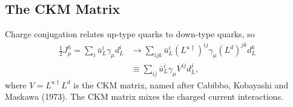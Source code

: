 \subsection{The CKM Matrix}
%
Charge conjugation relates up-type quarks to down-type quarks, so 
\begin{equation}
\begin{split}
\frac{1}{2} J_\mu^h = \sum_i \bar{u}_L^i \gamma_\mu d_L^i &\to \sum_{ijk} \bar{u}_L^i(L^{u \dagger})^{ij}\gamma_\mu(L^{d})^{jk}d_L^k \\
&\equiv \sum_{ij} \bar{u}_L^i \gamma_\mu V^{ij} d_L^j,
\end{split}
\end{equation}
where $V = L^{u \dagger} L^d$ is the CKM matrix, named after Cabibbo, Kobayashi and Maskawa (1973). The CKM matrix mixes the charged current interactions.

